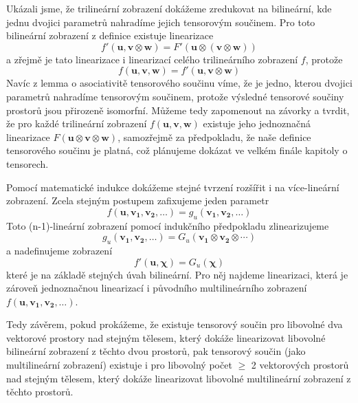 \documentclass[a5paper,12pt]{amsbook}
\theoremstyle{definition}
\newcommand{\myvec}[1]{\bm{#1}}
\begin{document}
Ukázali jsme, že trilineární zobrazení dokážeme zredukovat na bilineární, kde jednu dvojici parametrů
nahradíme jejich tensorovým součinem. Pro toto bilineární zobrazení z definice existuje linearizace
\begin{equation*}
f'(\myvec{u}, \myvec{v}\otimes\myvec{w}) = F'(\myvec{u}\otimes(\myvec{v}\otimes\myvec{w}))
\end{equation*}
a zřejmě je tato linearizace i linearizací celého trilineárního zobrazení $f$, protože
\begin{equation*}
f(\myvec{u}, \myvec{v}, \myvec{w}) = f'(\myvec{u}, \myvec{v}\otimes\myvec{w})
\end{equation*}
Navíc z lemma o asociativitě tensorového součinu víme, že je jedno, kterou dvojici parametrů
nahradíme tensorovým součinem, protože výsledné tensorové součiny prostorů jsou přirozeně
isomorfní. Můžeme tedy zapomenout na závorky a tvrdit, že pro každé trilineární zobrazení
$f(\myvec{u}, \myvec{v}, \myvec{w})$ existuje jeho jednoznačná linearizace
$F(\myvec{u}\otimes\myvec{v}\otimes\myvec{w})$, samozřejmě za předpokladu, že naše definice
tensorového součinu je platná, což plánujeme dokázat ve velkém finále kapitoly o tensorech.

Pomocí matematické indukce dokážeme stejné tvrzení rozšířit i na více-lineární zobrazení. Zcela
stejným postupem zafixujeme jeden parametr
\begin{equation*}
f(\myvec{u}, \myvec{v_1}, \myvec{v_2}, \hdots) = g_u(\myvec{v_1}, \myvec{v_2}, \hdots)
\end{equation*}
Toto (n-1)-lineární zobrazení pomocí indukčního předpokladu zlinearizujeme
\begin{equation*}
g_u(\myvec{v_1}, \myvec{v_2}, \hdots) = G_u(\myvec{v_1}\otimes\myvec{v_2}\otimes\cdots)
\end{equation*}
a nadefinujeme zobrazení
\begin{equation*}
f'(\myvec{u}, \myvec{\chi}) = G_u(\myvec{\chi})
\end{equation*}
které je na základě stejných úvah bilineární. Pro něj najdeme linearizaci, která je zároveň
jednoznačnou linearizací i původního multilineárního zobrazení
$f(\myvec{u}, \myvec{v_1}, \myvec{v_2}, \hdots)$.

Tedy závěrem, pokud prokážeme, že existuje tensorový součin pro libovolné dva vektorové prostory
nad stejným tělesem, který dokáže linearizovat libovolné bilineární zobrazení z těchto dvou
prostorů, pak tensorový součin (jako multilineární zobrazení) existuje i pro libovolný počet
$\geq$ 2 vektorových prostorů nad stejným tělesem, který dokáže linearizovat libovolné multilineární
zobrazení z těchto prostorů.
\end{document}
